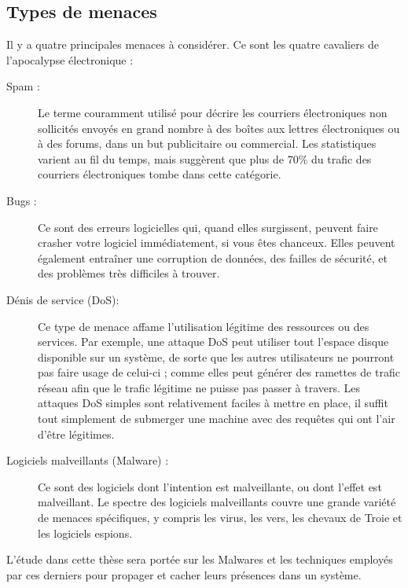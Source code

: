     \subsection{Types de menaces}
    Il y a quatre principales menaces à considérer. Ce sont les quatre cavaliers de l'apocalypse électronique :%
    \begin{description}
        \item[Spam :] Le terme couramment utilisé pour décrire les courriers électroniques non sollicités envoyés 
            en grand nombre à des boîtes aux lettres électroniques ou à des forums, dans un but publicitaire 
            ou commercial. Les statistiques varient au fil du temps, mais suggèrent que plus de 
            70\% \cite{spam} du trafic des courriers électroniques tombe dans cette catégorie.%
        \item[Bugs :] Ce sont des erreurs logicielles qui, quand elles surgissent, peuvent faire crasher votre 
            logiciel immédiatement, si vous êtes chanceux. Elles peuvent également entraîner une corruption de données,
            des failles de sécurité, et des problèmes très difficiles à trouver. \cite{virus} %
        \item[Dénis de service (DoS):] Ce type de menace affame l'utilisation légitime des ressources ou des 
            services. Par exemple, une attaque DoS peut utiliser tout l'espace disque disponible sur un 
            système, de sorte que les autres utilisateurs ne pourront pas faire usage de celui-ci ; comme elles
            peut générer des ramettes de trafic réseau afin que le trafic légitime ne puisse pas passer à travers.
            Les attaques DoS simples sont relativement faciles à mettre en place, il suffit tout simplement 
            de submerger une machine avec des requêtes qui ont l'air d'être légitimes. \cite{virus} %
        \item[Logiciels malveillants (Malware) :] Ce sont des logiciels dont l'intention est malveillante, 
            ou dont l'effet est malveillant. Le spectre des logiciels malveillants couvre une grande variété 
            de menaces spécifiques, y compris les virus, les vers, les chevaux de Troie et les logiciels espions.
            \cite{virus}%
    \end{description}

    L'étude dans cette thèse sera portée sur les Malwares et les techniques employés par ces derniers pour propager
    et cacher leurs présences dans un système. %

